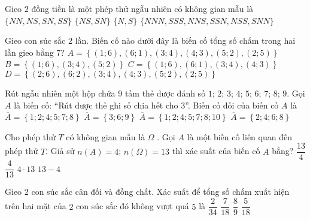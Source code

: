 \begin{ex}%
	Gieo $2$ đồng tiền là một phép thử ngẫu nhiên có không gian mẫu là
	\choice
	{\True $\{NN,NS,SN,SS\}$}
	{$\{NS,SN\}$}
	{$\{N,S\}$}
	{$\{NNN,SSS,NNS,SSN,NSS,SNN\}$}
\end{ex}
\begin{ex}%
	Gieo con súc sắc $2$ lần. Biến cố nào dưới đây là biến cố tổng số chấm trong hai lần gieo bằng $7$?
	\choice
	{\True $A=\left\{(1;6),(6;1),(3;4),(4;3),(5;2),(2;5)\right\}$}
	{$B=\left\{(1;6),(3;4),(5;2)\right\}$}
	{$C=\left\{(1;6),(6;1),(3;4),(4;3)\right\}$}
	{$D=\left\{(2;6),(6;2),(3;4),(4;3),(5;2),(2;5)\right\}$}
\end{ex}
\begin{ex}%
	Rút ngẫu nhiên một hộp chứa $9$ tấm thẻ được đánh số $1$; $2$; $3$; $4$; $5$; $6$; $7$; $8$; $9$. Gọi $A$ là biến cố: “Rút được thẻ ghi số chia hết cho $3$”. Biến cố đối của biến cố $A$ là
	\choice
	{$\overline{A}=\left\{1;2;4;5;7;8\right\}$}
	{$\overline{A}=\left\{3;6;9\right\}$}
	{\True $\overline{A}=\left\{1;2;4;5;7;8;10\right\}$}
	{$\overline{A}=\left\{2;4;6;8\right\}$}
\end{ex}
\begin{ex}%
	Cho phép thử $T$ có không gian mẫu là $\Omega$ . Gọi $A$ là một biến cố liên quan đến phép thử $T$. Giả sử $n(A)=4$; $n(\Omega)=13$ thì xác suất của biến cố $A$ bằng?
	\choice
	{$\dfrac{13}{4}$}
	{\True $\dfrac{4}{13}$}
	{$4\cdot 13$}
	{$13-4$}
\end{ex}
\begin{ex}%
	Gieo $2$ con súc sắc cân đối và đồng chất. Xác suất để tổng số chấm xuất hiện trên hai mặt của $2$
	con súc sắc đó không vượt quá $5$ là
	\choice
	{$\dfrac{2}{34}$}
	{$\dfrac{7}{18}$}
	{$\dfrac{8}{9}$}
	{\True $\dfrac{5}{18}$}
\end{ex}
